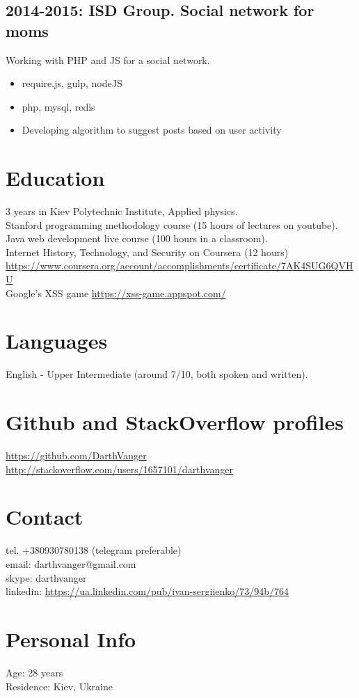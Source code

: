 \documentclass[a4paper, 14pt]{article}
\begin{document}
	\subsection{2014-2015: ISD Group. Social network for moms}
    Working with PHP and JS for a social network.
      \begin{itemize}
        \item require.js, gulp, nodeJS \\
        \item php, mysql, redis \\
        \item Developing algorithm to suggest posts based on user activity
      \end{itemize}

\section{Education}
	3 years in Kiev Polytechnic Institute, Applied physics. \\
	Stanford programming methodology course (15 hours of lectures on youtube). \\
	Java web development live course (100 hours in a classroom). \\
  Internet History, Technology, and Security on Coursera (12 hours) \url{https://www.coursera.org/account/accomplishments/certificate/7AK4SUG6QVHU} \\
  Google's XSS game \url{https://xss-game.appspot.com/}

\section{Languages}
	English - Upper Intermediate (around 7/10, both spoken and written).

\section{Github and StackOverflow profiles}
  \url{https://github.com/DarthVanger} \\
  \url{http://stackoverflow.com/users/1657101/darthvanger}

\section{Contact}
	tel. +380930780138 (telegram preferable) \\
	email: darthvanger@gmail.com \\
  skype: darthvanger \\
  linkedin: \url{https://ua.linkedin.com/pub/ivan-sergiienko/73/94b/764} \\

\section{Personal Info}
	Age: 28 years \\
	Residence: Kiev, Ukraine
\end{document}
